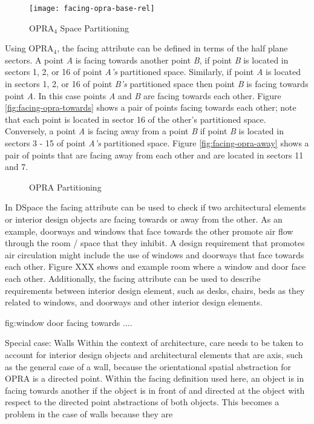 \documentclass[12pt]{ucthesis}
\begin{document}
\begin{figure}[H]
\centering
\texttt{[image: facing-opra-base-rel]}
\caption{OPRA$_{4}$ Space Partitioning}
\label{facing-opra-base-rel}
\end{figure}

Using OPRA$_{4}$, the facing attribute can be defined in terms of the half plane sectors. A point \emph{A} is facing towards another point \emph{B}, if point \emph{B} is located in sectors 1, 2, or 16 of point \emph{A's} partitioned space. Similarly, if point \emph{A} is located in sectors 1, 2, or 16 of point \emph{B's} partitioned space then point \emph{B} is facing towards point \emph{A}. In this case points \emph{A} and \emph{B} are facing towards each other. Figure \ref{fig:facing-opra-towards} shows a pair of points facing towards each other; note that each point is located in sector 16 of the other's partitioned space. Conversely, a point \emph{A} is facing away from a point \emph{B} if point \emph{B} is located in sectors 3 - 15 of point \emph{A's} partitioned space. Figure \ref{fig:facing-opra-away} shows a pair of points that are facing away from each other and are located in sectors 11 and 7. 

\begin{figure}[H]
 \centering
  \hspace{10 mm}
 \caption{OPRA Partitioning }
\label{opra-facing}
\end{figure}

In DSpace the facing attribute can be used to check if two architectural elements or interior design objects are facing towards or away from the other. As an example, doorways and windows that face towards the other promote air flow through the room / space that they inhibit. A design requirement that promotes air circulation might include the use of windows and doorways that face towards each other. Figure XXX shows and example room where a window and door face each other. Additionally, the facing attribute can be used to describe requirements between interior design element, such as desks, chairs, beds as they related to windows, and doorways and other interior design elements.  

fig:window door facing towards ....

Special case: Walls
 Within the context of architecture, care needs to be taken to account for interior design objects and architectural elements that are axis, such as the general   case of a wall, because the orientational spatial abstraction for OPRA is a directed point. Within the facing definition used here, an object is in facing towards another if the object is in front of and directed at the object with respect to the directed point abstractions of both objects. This becomes a problem in the case of walls because they are
\end{document}
